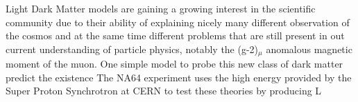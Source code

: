 Light Dark Matter models are gaining a growing interest in the scientific community due to their ability of explaining nicely many different observation of the cosmos and at the same time different problems that are still present in out current understanding of particle physics, notably the (g-2)$_{\mu}$ anomalous magnetic moment of the muon. One simple model to probe this new class of dark matter predict the existence The NA64 experiment uses the high energy provided by the Super Proton Synchrotron at CERN to test these theories by producing L
